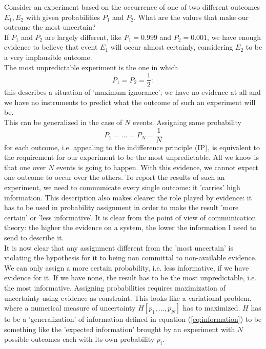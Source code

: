 \documentclass[twocolumn,showpacs,preprintnumbers,nofootinbib,prd,
superscriptaddress,10pt]{revtex4-1}
\begin{document}
Consider an experiment based on the occurrence of one of two different outcomes $E_1, E_2$ with given probabilities $P_1$ and $P_2$. What are the values that make our outcome the most uncertain? \\ 
If $P_1$ and $P_2$ are largely different, like $P_1 = 0.999$ and $P_2 = 0.001$, we have enough evidence to believe that event $E_1$ will occur almost certainly, considering $E_2$ to be a very implausible outcome. \\ 
The most unpredictable experiment is the one in which 
\begin{equation}\nonumber
    P_1 = P_2 = \frac{1}{2}:
\end{equation}
this describes a situation of 'maximum ignorance'; we have no evidence at all and we have no instruments to predict what the outcome of such an experiment will be.  \\ 
This can be generalized in the case of $N$ events. Assigning same probability
\begin{equation*}
    P_1 = \dots = P_N = \frac{1}{N}
\end{equation*}
for each outcome, i.e. appealing to the indifference principle (IP), is equivalent to the requirement for our experiment to be the most unpredictable. 
All we know is that one over $N$ events is going to happen. With this evidence, we cannot expect one outcome to occur over the others. 
To report the results of such an experiment, we need to communicate every single outcome: it 'carries' high information. 
This description also makes clearer the role played by evidence: it has to be used in probability assignment in order to make the result 'more certain' or 'less informative'. It is clear from the point of view of communication theory: the higher the evidence on a system, the lower the information I need to send to describe it. \\ 
It is now clear that any assignment different from the 'most uncertain' is violating the hypothesis for it to being non committal to non-available evidence. We can only assign a more certain probability, i.e. less informative, if we have evidence for it. If we have none, the result has to be the most unpredictable, i.e. the most informative. 
Assigning probabilities requires maximization of uncertainty using evidence as constraint. This looks like a variational problem, where a numerical measure of uncertainty $H\left[p_1, \dots, p_N\right]$ has to maximized. $H$ has to be a 'generalization' of information defined in equation (\ref{eq:information}) to be something like the 'expected information' brought by an experiment with $N$ possible outcomes each with its own probability $p_i$.  \\ 
\end{document}
